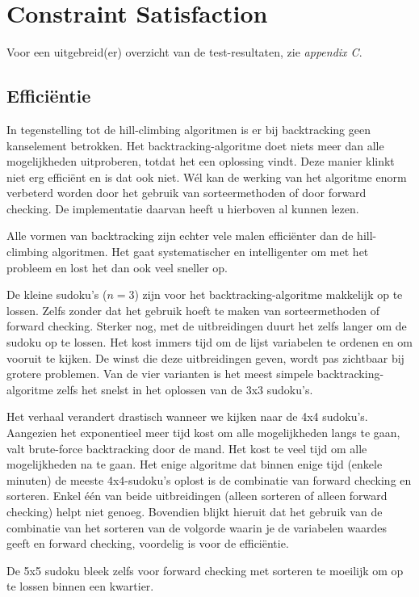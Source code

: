 \documentclass[]{report}
\begin{document}
\section{Constraint Satisfaction}
Voor een uitgebreid(er) overzicht van de test-resultaten, zie \textit{appendix C}.
\subsection{Effici\"{e}ntie}
In tegenstelling tot de hill-climbing algoritmen is er bij backtracking geen kanselement betrokken. Het backtracking-algoritme doet niets meer dan alle mogelijkheden uitproberen, totdat het een oplossing vindt. Deze manier klinkt niet erg effici\"ent en is dat ook niet. W\'el kan de werking van het algoritme enorm verbeterd worden door het gebruik van sorteermethoden of door forward checking. De implementatie daarvan heeft u hierboven al kunnen lezen. 

Alle vormen van backtracking zijn echter vele malen effici\"{e}nter dan de hill-climbing algoritmen. Het gaat systematischer en intelligenter om met het probleem en lost het dan ook veel sneller op.

De kleine sudoku's ($n = 3$) zijn voor het backtracking-algoritme makkelijk op te lossen. Zelfs zonder dat het gebruik hoeft te maken van sorteermethoden of forward checking. Sterker nog, met de uitbreidingen duurt het zelfs langer om de sudoku op te lossen. Het kost immers tijd om de lijst variabelen te ordenen en om vooruit te kijken. De winst die deze uitbreidingen geven, wordt pas zichtbaar bij grotere problemen. Van de vier varianten is het meest simpele backtracking-algoritme zelfs het snelst in het oplossen van de 3x3 sudoku's.

Het verhaal verandert drastisch wanneer we kijken naar de 4x4 sudoku's. Aangezien het exponentieel meer tijd kost om alle mogelijkheden langs te gaan, valt brute-force backtracking door de mand. Het kost te veel tijd om alle mogelijkheden na te gaan. Het enige algoritme dat binnen enige tijd (enkele minuten) de meeste 4x4-sudoku's oplost is de combinatie van forward checking en sorteren. Enkel \'e\'en van beide uitbreidingen (alleen sorteren of alleen forward checking) helpt niet genoeg. Bovendien blijkt hieruit dat het gebruik van de combinatie van het sorteren van de volgorde waarin je de variabelen waardes geeft en forward checking, voordelig is voor de effici\"{e}ntie. 

De 5x5 sudoku bleek zelfs voor forward checking met sorteren te moeilijk om op te lossen binnen een kwartier.
\end{document}
